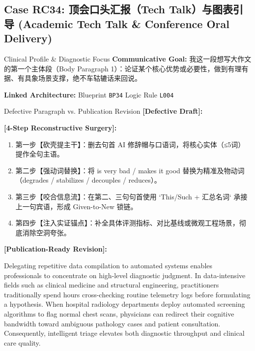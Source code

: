 \subsection{Case RC34: 顶会口头汇报（Tech Talk）与图表引导 (Academic Tech Talk \& Conference Oral Delivery)}\label{case:RC34}
\begin{ConceptBox}{Clinical Profile \& Diagnostic Focus}
\textbf{Communicative Goal:} 我这一段想写大作文的第一个主体段（Body Paragraph 1）：论证某个核心优势或必要性，做到有理有据、有具象场景支撑，绝不车轱辘话来回说。\par
\textbf{Linked Architecture:} Blueprint \texttt{BP34} \enspace\textbar\enspace Logic Rule \texttt{L004}
\end{ConceptBox}
\begin{ExampleBox}{Defective Paragraph vs. Publication Revision}
\textbf{\color{TargetHighlight}[Defective Draft]:}\par
{}\par\vspace{6pt}
\textbf{\color{AcadForest}[4-Step Reconstructive Surgery]:}
\begin{enumerate}[label=\textbf{\color{AcadNavy}Step \arabic*:}, leftmargin=2em]
  \item 第一步【砍壳提主干】：删去句首 AI 修辞帽与口语词，将核心实体（≤5词）提作全句主语。
  \item 第二步【强动词替换】：将 is very bad / makes it good 替换为精准及物动词（degrades / stabilizes / decouples / reduces）。
  \item 第三步【咬合信息流】：在第二、三句句首使用 `This/Such + 汇总名词` 承接上一句宾语，形成 Given-to-New 锁链。
  \item 第四步【注入实证锚点】：补全具体评测指标、对比基线或微观工程场景，彻底消除空洞夸张。
\end{enumerate}\vspace{4pt}
\textbf{\color{AcadNavy}[Publication-Ready Revision]:}\par
Delegating repetitive data compilation to automated systems enables professionals to concentrate on high-level diagnostic judgment. In data-intensive fields such as clinical medicine and structural engineering, practitioners traditionally spend hours cross-checking routine telemetry logs before formulating a hypothesis. When hospital radiology departments deploy automated screening algorithms to flag normal chest scans, physicians can redirect their cognitive bandwidth toward ambiguous pathology cases and patient consultation. Consequently, intelligent triage elevates both diagnostic throughput and clinical care quality.
\end{ExampleBox}
